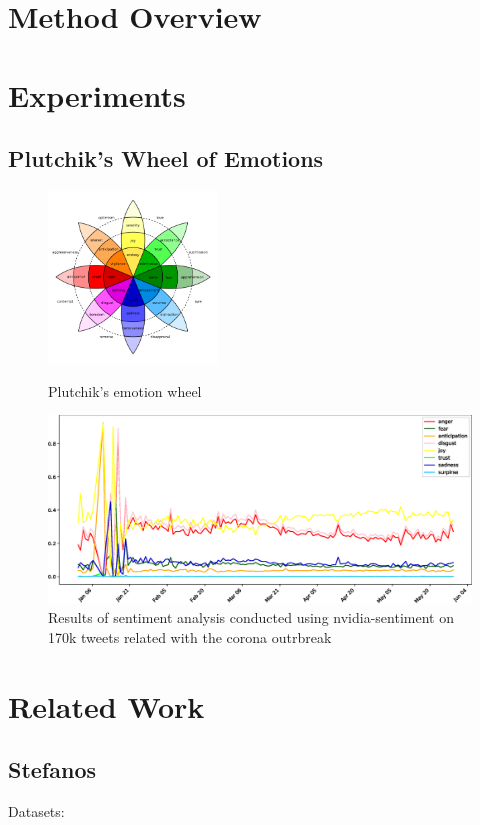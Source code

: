 \documentclass[11pt]{article}
\begin{document}
\section{Method Overview}
\label{sec:method}

\section{Experiments}
\label{sec:experiments}


\subsection{Plutchik's Wheel of Emotions}

\begin{figure}[!ht]
    \includegraphics[width=0.4\textwidth]{images/Plutchik-wheel.png}
    \caption{Plutchik's emotion wheel}
    \label{fig:2}
    \includegraphics[width=\textwidth]{images/emotions.eps}
    \caption{Results of sentiment analysis conducted using nvidia-sentiment on 170k tweets related with the corona outrbreak }
    \label{fig:3}
\end{figure}
\newpage

\section{Related Work}
\label{sec:related}
\subsection{Stefanos}
Datasets: 
\end{document}
